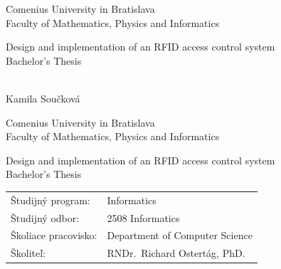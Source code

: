 \def\mfrok{2016}
\def\mfnazov{Design and implementation of an RFID access control system}
\def\mftyp{Bachelor's Thesis}
\def\mfautor{Kamila Součková}
\def\mfskolitel{RNDr.~Richard Ostertág, PhD.}


\def\mfmiesto{Bratislava, \mfrok}

\def\mfodbor{2508 Informatics}
\def\program{ Informatics }
\def\mfpracovisko{ Department of Computer Science }

\thispagestyle{empty}

\begin{center}
\sc\large
Comenius University in Bratislava\\
Faculty of Mathematics, Physics and Informatics

\vfill

{\LARGE\mfnazov}\\
\mftyp
\end{center}

\vfill

{\sc\large
\noindent \mfrok\\
\mfautor
}

\eject %


\thispagestyle{empty}
\noindent

\begin{center}
\sc
\large
Comenius University in Bratislava\\
Faculty of Mathematics, Physics and Informatics

\vfill

{\LARGE\mfnazov}\\
\mftyp
\end{center}

\vfill

\noindent
\begin{tabular}{ll}
Študijný program: & \program \\
Študijný odbor: & \mfodbor \\
Školiace pracovisko: & \mfpracovisko \\
Školiteľ: & \mfskolitel \\
\end{tabular}


